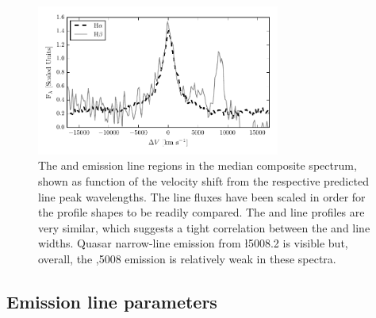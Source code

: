 \begin{figure}
    \includegraphics[width=8cm]{figures/chapter02/ha_hb_composite.pdf} 
    \caption{The \ha and \hb emission line regions in the median composite spectrum, shown as function of the velocity shift from the respective predicted line peak wavelengths. The line fluxes have been scaled in order for the profile shapes to be readily compared. The \ha and \hb line profiles are very similar, which suggests a tight correlation between the \ha and \hb line widths. Quasar narrow-line emission from \l5008.2 is visible but, overall, the ,5008 emission is relatively weak in these spectra.}
    \label{fig:balmer_composite}
\end{figure}

\subsection{Emission line parameters}

